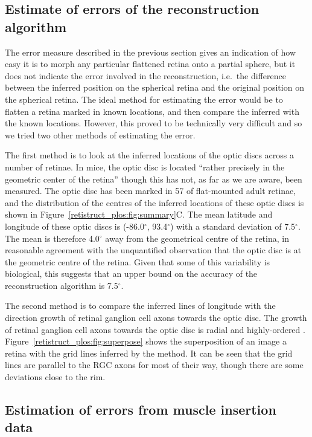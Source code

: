 \documentclass[10pt]{article}
\begin{document}
\subsection*{Estimate of errors of the reconstruction algorithm}

The error measure described in the previous section gives an
indication of how easy it is to morph any particular flattened retina
onto a partial sphere, but it does not indicate the error involved in
the reconstruction, i.e.\ the difference between the inferred
position on the spherical retina and the original position on the
spherical retina. The ideal method for estimating the error would be
to flatten a retina marked in known locations, and then compare the
inferred with the known locations. However, this proved to be
technically very difficult and so we tried two other methods of
estimating the error.

The first method is to look at the inferred locations of the optic
discs across a number of retinae. In mice, the optic disc is located
``rather precisely in the geometric center of the retina''
\cite{DragOlse81gang} though this has not, as far as we are aware,
been measured. The optic disc has been marked in 57 of flat-mounted
adult retinae, and the distribution of the centres of the inferred
locations of these optic discs is shown in
Figure~\ref{retistruct_plos:fig:summary}C. The mean latitude and
longitude of these optic discs is (-86.0$^\circ$, 93.4$^\circ$) with a
standard deviation of 7.5$^\circ$. The mean is therefore 4.0$^\circ$
away from the geometrical centre of the retina, in reasonable
agreement with the unquantified observation that the optic disc is at
the geometric centre of the retina.  Given that some of this
variability is biological, this suggests that an upper bound on the
accuracy of the reconstruction algorithm is 7.5$^\circ$.

The second method is to compare the inferred lines of longitude with
the direction growth of retinal ganglion cell axons towards the optic
disc.  The growth of retinal ganglion cell axons towards the optic
disc is radial and highly-ordered
\cite{ErskThom09intr}. Figure~\ref{retistruct_plos:fig:superpose}
shows the superposition of an image a retina \cite{KeelEtal11neur}
with the grid lines inferred by the method. It can be seen that the
grid lines are parallel to the RGC axons for most of their way, though
there are some deviations close to the rim.

\subsection*{Estimation of errors from muscle insertion data}
\end{document}
